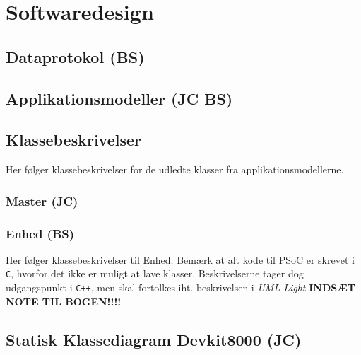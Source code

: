 \chapter{Softwaredesign}

\section{Dataprotokol (BS)}


\section{Applikationsmodeller (JC BS)}


\section{Klassebeskrivelser}
Her følger klassebeskrivelser for de udledte klasser fra applikationsmodellerne.

\subsection{Master (JC)}






\subsection{Enhed (BS)}
Her følger klassebeskrivelser til Enhed. 
Bemærk at alt kode til PSoC er skrevet i \verb+C+, hvorfor det ikke er muligt at lave klasser. Beskrivelserne tager dog udgangspunkt i \verb-C++-, men skal fortolkes iht. beskrivelsen i \textit{UML-Light} \textbf{INDSÆT NOTE TIL BOGEN!!!!}









\clearpage
\vspace{10 mm}

\section{Statisk Klassediagram Devkit8000 (JC)}



\clearpage

